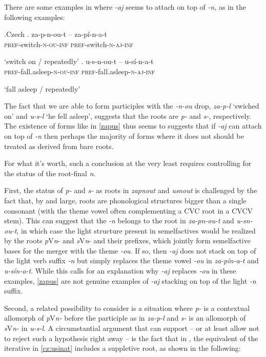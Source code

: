 There are some examples in  where \textit{-aj} seems to attach on top of \textit{-n}, as in the following examples:

\ex.Czech\label{zapus}
\ag. za-p-n-ou-t -- za-p\'i-n-a-t\\
 \textsc{pref}-switch-\textsc{n-ou-inf} {} \textsc{pref}-switch-\textsc{n-aj-inf}\\
 \strut `switch on / repeatedly'
\bg. u-s-n-ou-t -- u-s\'i-n-a-t\\
\textsc{pref}-fall.asleep-\textsc{n-ou-inf} {} \textsc{pref}-fall.asleep-\textsc{n-aj-inf}\\
\strut `fall asleep / repeatedly'\label{cz:usinat}

The fact that we are able to form participles with the \textit{-n-ou} drop, \textit{za-p-l} `swiched on' and \textit{u-s-l} `he fell asleep', suggests that the roots are \textit{p-} and \textit{s-}, respectively. The existence of forms like in \ref{zapus} thus seems to suggests that if \textit{-aj} can attach on top of \textit{-n} then perhaps the majority of forms where it does not should be treated as derived from bare roots.
\par
For what it's worth, such a conclusion at the very least requires controlling for the status of the root-final \textit{n}.
\par
First, the status of \textit{p-} and \textit{s-} as roots in \textit{zapnout} and \textit{usnout} is challenged by the fact that, by and large,  roots are phonological structures bigger than a single consonant (with the theme vowel  often complementing a CVC root in a CVCV stem). This can suggest that the \textit{-n} belongs to the root in \textit{za-pn-ou-t} and \textit{u-sn-ou-t}, in which case the light  structure present in  semelfactives would be realized by the roots \textit{p}V\textit{n}- and \textit{s}V\textit{n}- and their prefixes, which jointly form semelfactive bases for the merger with the theme \textit{-ou}. If so, then \textit{-aj} does not stack on top of the light verb suffix \textit{-n} but simply replaces the theme vowel \textit{-ou} in \textit{za-p\'in-a-t} and \textit{u-s\'in-a-t}. While this calls for an explanation why \textit{-aj} replaces \textit{-ou} in these examples, \ref{zapus} are not genuine examples of \textit{-aj} stacking on top of the light \textit{-n} suffix. 
\par
Second, a related possibility to consider is a situation where \textit{p-} is a contextual allomorph  of \textit{p}V\textit{n-} before the participle as in \textit{za-p-l} and \textit{s-} is an allomorph of \textit{s}V\textit{n-} in \textit{u-s-l}. A circumstantial argument that can support -- or at least allow not to reject such a hypothesis right away -- is the fact that in , the equivalent of the  iterative in \ref{cz:usinat} includes a suppletive root, as shown in the following:

